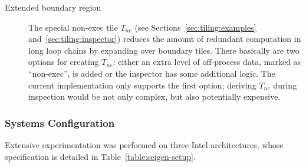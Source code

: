 \begin{description}
\item[Extended boundary region] The special non-exec tile $T_{ne}$ (see Sections~\ref{sec:tiling:examples} and~\ref{sec:tiling:inspector}) reduces the amount of redundant computation in long loop chains by expanding over boundary tiles. There basically are two options for creating $T_{ne}$: either an extra level of off-process data, marked as ``non-exec'', is added or the inspector has some additional logic. The current implementation only supports the first option; deriving $T_{ne}$ during inspection would be not only complex, but also potentially expensive. 
\end{description}



\subsubsection{Systems Configuration}
Extensive experimentation was performed on three Intel architectures, whose specification is detailed in Table~\ref{table:seigen-setup}. 

\begin{table}[htpb]
\scriptsize
{}
\caption{Systems specification.}
\label{table:seigen-setup}
\end{table}


